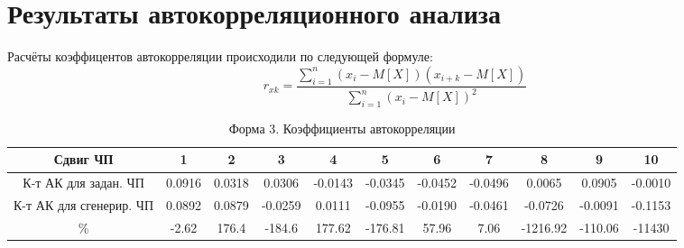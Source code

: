\documentclass{article}
\begin{document}
\section{Результаты автокорреляционного анализа}

Расчёты коэффицентов автокорреляции происходили по следующей формуле:
\[r_{xk} = \frac{\sum_{i=1}^{n}(x_i - M[X])(x_{i+k} - M[X])}{\sum_{i=1}^{n}(x_i - M[X])^2}\]

\begin{table}[H]
    \centering
    \caption{Форма 3. Коэффициенты автокорреляции}
    \begin{tabular}{|c|c|c|c|c|c|c|c|c|c|c|}
        \hline
        Сдвиг ЧП & 1 & 2 & 3 & 4 & 5 & 6 & 7 & 8 & 9 & 10\\
        \hline
        К-т АК для задан. ЧП & 0.0916 & 0.0318 & 0.0306 & -0.0143 & -0.0345 & -0.0452 & -0.0496 & 0.0065 & 0.0905 & -0.0010\\
        \hline
        К-т АК для сгенерир. ЧП & 0.0892 & 0.0879 & -0.0259 & 0.0111 & -0.0955 & -0.0190 & -0.0461 & -0.0726 & -0.0091 & -0.1153\\
        \hline 
        \% & -2.62 & 176.4 & -184.6 & 177.62 & -176.81 & 57.96 & 7.06 & -1216.92 & -110.06 & -11430\\
        \hline
    \end{tabular}
\end{table}
\end{document}
